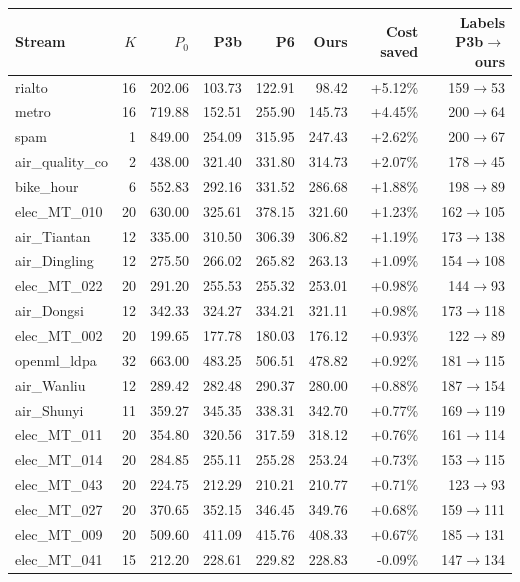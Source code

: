 \begin{tabular}{lrrrrrrr}
\toprule
Stream & $K$ & $P_0$ & P3b & P6 & Ours & Cost saved & Labels P3b$\to$ours \\
\midrule
rialto & 16 & 202.06 & 103.73 & 122.91 & 98.42 & +5.12\% & 159$\to$53 \\
metro & 16 & 719.88 & 152.51 & 255.90 & 145.73 & +4.45\% & 200$\to$64 \\
spam & 1 & 849.00 & 254.09 & 315.95 & 247.43 & +2.62\% & 200$\to$67 \\
air\_quality\_co & 2 & 438.00 & 321.40 & 331.80 & 314.73 & +2.07\% & 178$\to$45 \\
bike\_hour & 6 & 552.83 & 292.16 & 331.52 & 286.68 & +1.88\% & 198$\to$89 \\
elec\_MT\_010 & 20 & 630.00 & 325.61 & 378.15 & 321.60 & +1.23\% & 162$\to$105 \\
air\_Tiantan & 12 & 335.00 & 310.50 & 306.39 & 306.82 & +1.19\% & 173$\to$138 \\
air\_Dingling & 12 & 275.50 & 266.02 & 265.82 & 263.13 & +1.09\% & 154$\to$108 \\
elec\_MT\_022 & 20 & 291.20 & 255.53 & 255.32 & 253.01 & +0.98\% & 144$\to$93 \\
air\_Dongsi & 12 & 342.33 & 324.27 & 334.21 & 321.11 & +0.98\% & 173$\to$118 \\
elec\_MT\_002 & 20 & 199.65 & 177.78 & 180.03 & 176.12 & +0.93\% & 122$\to$89 \\
openml\_ldpa & 32 & 663.00 & 483.25 & 506.51 & 478.82 & +0.92\% & 181$\to$115 \\
air\_Wanliu & 12 & 289.42 & 282.48 & 290.37 & 280.00 & +0.88\% & 187$\to$154 \\
air\_Shunyi & 11 & 359.27 & 345.35 & 338.31 & 342.70 & +0.77\% & 169$\to$119 \\
elec\_MT\_011 & 20 & 354.80 & 320.56 & 317.59 & 318.12 & +0.76\% & 161$\to$114 \\
elec\_MT\_014 & 20 & 284.85 & 255.11 & 255.28 & 253.24 & +0.73\% & 153$\to$115 \\
elec\_MT\_043 & 20 & 224.75 & 212.29 & 210.21 & 210.77 & +0.71\% & 123$\to$93 \\
elec\_MT\_027 & 20 & 370.65 & 352.15 & 346.45 & 349.76 & +0.68\% & 159$\to$111 \\
elec\_MT\_009 & 20 & 509.60 & 411.09 & 415.76 & 408.33 & +0.67\% & 185$\to$131 \\
elec\_MT\_041 & 15 & 212.20 & 228.61 & 229.82 & 228.83 & -0.09\% & 147$\to$134 \\
\bottomrule
\end{tabular}
